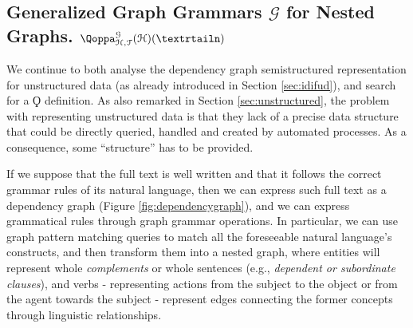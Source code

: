 
\subsection{Generalized Graph Grammars $\mathcal{G}$ for Nested Graphs. $\qtransl_{\mathcal{H},\mathcal{T}}^{\mathcal{G}}(\mathcal{H})(\nested)$}\label{subsec:gggSec}\label{sec:semistructunstradata}
We continue to both analyse the dependency graph semistructured representation for unstructured data (as already introduced in Section \vref{sec:idifud}), and search for a $\Qoppa$ definition. As also remarked in Section \vref{sec:unstructured}, the problem with representing unstructured data is that they lack of a precise data structure that could be directly queried, handled and created by automated processes. As a consequence, some ``structure'' has to be provided.



	If we suppose that the full text is well written and that it follows the correct grammar rules of its natural language, then we can express such full text as a dependency graph (Figure \vref{fig:dependencygraph}), and we can express grammatical rules through graph grammar operations. In particular, we can use graph pattern matching queries to match all the foreseeable natural language's constructs, and then transform them into a nested graph, where entities will represent whole \textit{complements} or whole sentences (e.g., \textit{dependent or subordinate clauses}), and verbs - representing actions from the subject to the object or from the agent towards the subject - represent edges connecting the former concepts through linguistic relationships. 
	

